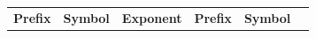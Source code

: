 {{    %
    
        \begin{center}
      
      \label{m30853*uid32}
      
    \noindent
      \tablelasttail{}
      \begin{xtabular}[t]{|l|l|l|l|l|l|}\hline
    
    
        
                \textbf{Prefix}
               &
    
    
        
                \textbf{Symbol}
               &
    
    
        
                \textbf{Exponent}
               &
    
    
        
                \textbf{Prefix}
               &
    
    
        
                \textbf{Symbol}
               &
    
    
        

\end{xtabular}
\end{center}}}
